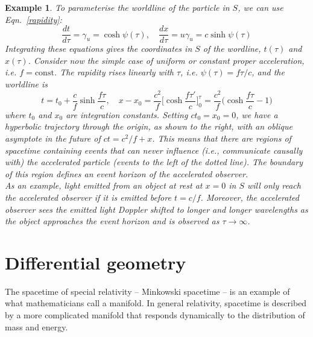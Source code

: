 \documentclass[a4paper]{article}
\newtheorem{eg}{Example}[section]
\theoremstyle{new}
\begin{document}
\newpage
\begin{eg}
To parameterise the worldline of the particle in $S$, we can use Eqn.~\ref{rapidity}:
$$\frac{dt}{d\tau}=\gamma_u=\cosh\psi(\tau),\quad\frac{dx}{d\tau}=u\gamma_u=c\sinh\psi(\tau)$$
Integrating these equations gives the coordinates in $S$ of the wordline, $t(\tau)$ and $x(\tau)$. Consider now the simple case of uniform or constant proper acceleration, i.e. $f=\text{const}$. The rapidity rises linearly with $\tau$, i.e. $\psi(\tau)=f\tau/c$, and the worldline is
$$t=t_0+\frac{c}{f}\sinh\frac{f\tau}{c},\quad x-x_0=\frac{c^2}{f}\bigg[\cosh\frac{f\tau'}{c}\bigg]_0^\tau=\frac{c^2}{f}\bigg(\cosh\frac{f\tau}{c}-1\bigg)$$
where $t_0$ and $x_0$ are integration constants. Setting $ct_0=x_0=0$, we have a hyperbolic trajectory through the origin, as shown to the right, with an oblique asymptote in the future of $ct = c^2/f + x$. This means that there are regions of spacetime containing events that can never influence (i.e., communicate causally with) the accelerated particle (events to the left of the dotted line). The boundary of this region defines an event horizon of the accelerated observer.\\[5pt]
As an example, light emitted from an object at rest at $x = 0$ in $S$ will only reach the accelerated observer if it is emitted before $t = c/f$. Moreover, the accelerated observer sees the emitted light Doppler shifted to longer and longer wavelengths as the object approaches the event horizon and is observed as $\tau\rightarrow\infty$.
\end{eg}
\begin{center}
\end{center}
\newpage
\section{Differential geometry}
The spacetime of special relativity – Minkowski spacetime – is an example of what mathematicians call a manifold. In general relativity, spacetime is described by a more complicated manifold that responds dynamically to the distribution of mass and energy.
\end{document}
